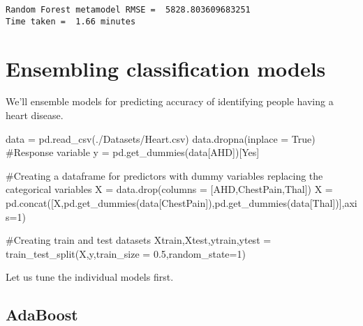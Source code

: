 \documentclass[
  letterpaper,
  DIV=11,
  numbers=noendperiod]{scrreprt}
\newenvironment{Shaded}{\begin{snugshade}}{\end{snugshade}}
\newcommand{\CommentTok}[1]{\textcolor[rgb]{0.37,0.37,0.37}{#1}}
\newcommand{\DecValTok}[1]{\textcolor[rgb]{0.68,0.00,0.00}{#1}}
\newcommand{\FloatTok}[1]{\textcolor[rgb]{0.68,0.00,0.00}{#1}}
\newcommand{\NormalTok}[1]{\textcolor[rgb]{0.00,0.23,0.31}{#1}}
\newcommand{\OperatorTok}[1]{\textcolor[rgb]{0.37,0.37,0.37}{#1}}
\newcommand{\StringTok}[1]{\textcolor[rgb]{0.13,0.47,0.30}{#1}}
\newcommand{\VariableTok}[1]{\textcolor[rgb]{0.07,0.07,0.07}{#1}}
\begin{document}
\begin{verbatim}
Random Forest metamodel RMSE =  5828.803609683251
Time taken =  1.66 minutes
\end{verbatim}

\section{Ensembling classification
models}\label{ensembling-classification-models}

We'll ensemble models for predicting accuracy of identifying people
having a heart disease.

\begin{Shaded}
\begin{Highlighting}[]
\NormalTok{data }\OperatorTok{=}\NormalTok{ pd.read\_csv(}\StringTok{\textquotesingle{}./Datasets/Heart.csv\textquotesingle{}}\NormalTok{)}
\NormalTok{data.dropna(inplace }\OperatorTok{=} \VariableTok{True}\NormalTok{)}
\CommentTok{\#Response variable}
\NormalTok{y }\OperatorTok{=}\NormalTok{ pd.get\_dummies(data[}\StringTok{\textquotesingle{}AHD\textquotesingle{}}\NormalTok{])[}\StringTok{\textquotesingle{}Yes\textquotesingle{}}\NormalTok{]}

\CommentTok{\#Creating a dataframe for predictors with dummy variables replacing the categorical variables}
\NormalTok{X }\OperatorTok{=}\NormalTok{ data.drop(columns }\OperatorTok{=}\NormalTok{ [}\StringTok{\textquotesingle{}AHD\textquotesingle{}}\NormalTok{,}\StringTok{\textquotesingle{}ChestPain\textquotesingle{}}\NormalTok{,}\StringTok{\textquotesingle{}Thal\textquotesingle{}}\NormalTok{])}
\NormalTok{X }\OperatorTok{=}\NormalTok{ pd.concat([X,pd.get\_dummies(data[}\StringTok{\textquotesingle{}ChestPain\textquotesingle{}}\NormalTok{]),pd.get\_dummies(data[}\StringTok{\textquotesingle{}Thal\textquotesingle{}}\NormalTok{])],axis}\OperatorTok{=}\DecValTok{1}\NormalTok{)}

\CommentTok{\#Creating train and test datasets}
\NormalTok{Xtrain,Xtest,ytrain,ytest }\OperatorTok{=}\NormalTok{ train\_test\_split(X,y,train\_size }\OperatorTok{=} \FloatTok{0.5}\NormalTok{,random\_state}\OperatorTok{=}\DecValTok{1}\NormalTok{)}
\end{Highlighting}
\end{Shaded}

Let us tune the individual models first.

\subsection*{AdaBoost}\label{adaboost}
\end{document}
